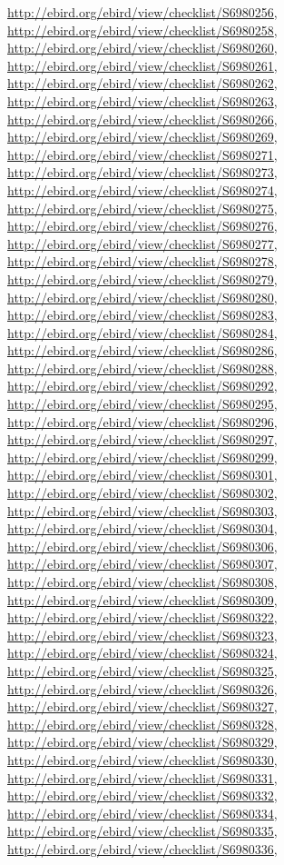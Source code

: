 \documentclass[9pt, article]{memoir}
\begin{document}
\begin{multicols}{2}
\url{http://ebird.org/ebird/view/checklist/S6980256}, 
\url{http://ebird.org/ebird/view/checklist/S6980258}, 
\url{http://ebird.org/ebird/view/checklist/S6980260}, 
\url{http://ebird.org/ebird/view/checklist/S6980261}, 
\url{http://ebird.org/ebird/view/checklist/S6980262}, 
\url{http://ebird.org/ebird/view/checklist/S6980263}, 
\url{http://ebird.org/ebird/view/checklist/S6980266}, 
\url{http://ebird.org/ebird/view/checklist/S6980269}, 
\url{http://ebird.org/ebird/view/checklist/S6980271}, 
\url{http://ebird.org/ebird/view/checklist/S6980273}, 
\url{http://ebird.org/ebird/view/checklist/S6980274}, 
\url{http://ebird.org/ebird/view/checklist/S6980275}, 
\url{http://ebird.org/ebird/view/checklist/S6980276}, 
\url{http://ebird.org/ebird/view/checklist/S6980277}, 
\url{http://ebird.org/ebird/view/checklist/S6980278}, 
\url{http://ebird.org/ebird/view/checklist/S6980279}, 
\url{http://ebird.org/ebird/view/checklist/S6980280}, 
\url{http://ebird.org/ebird/view/checklist/S6980283}, 
\url{http://ebird.org/ebird/view/checklist/S6980284}, 
\url{http://ebird.org/ebird/view/checklist/S6980286}, 
\url{http://ebird.org/ebird/view/checklist/S6980288}, 
\url{http://ebird.org/ebird/view/checklist/S6980292}, 
\url{http://ebird.org/ebird/view/checklist/S6980295}, 
\url{http://ebird.org/ebird/view/checklist/S6980296}, 
\url{http://ebird.org/ebird/view/checklist/S6980297}, 
\url{http://ebird.org/ebird/view/checklist/S6980299}, 
\url{http://ebird.org/ebird/view/checklist/S6980301}, 
\url{http://ebird.org/ebird/view/checklist/S6980302}, 
\url{http://ebird.org/ebird/view/checklist/S6980303}, 
\url{http://ebird.org/ebird/view/checklist/S6980304}, 
\url{http://ebird.org/ebird/view/checklist/S6980306}, 
\url{http://ebird.org/ebird/view/checklist/S6980307}, 
\url{http://ebird.org/ebird/view/checklist/S6980308}, 
\url{http://ebird.org/ebird/view/checklist/S6980309}, 
\url{http://ebird.org/ebird/view/checklist/S6980322}, 
\url{http://ebird.org/ebird/view/checklist/S6980323}, 
\url{http://ebird.org/ebird/view/checklist/S6980324}, 
\url{http://ebird.org/ebird/view/checklist/S6980325}, 
\url{http://ebird.org/ebird/view/checklist/S6980326}, 
\url{http://ebird.org/ebird/view/checklist/S6980327}, 
\url{http://ebird.org/ebird/view/checklist/S6980328}, 
\url{http://ebird.org/ebird/view/checklist/S6980329}, 
\url{http://ebird.org/ebird/view/checklist/S6980330}, 
\url{http://ebird.org/ebird/view/checklist/S6980331}, 
\url{http://ebird.org/ebird/view/checklist/S6980332}, 
\url{http://ebird.org/ebird/view/checklist/S6980334}, 
\url{http://ebird.org/ebird/view/checklist/S6980335}, 
\url{http://ebird.org/ebird/view/checklist/S6980336}, 

\end{multicols}
\end{document}
